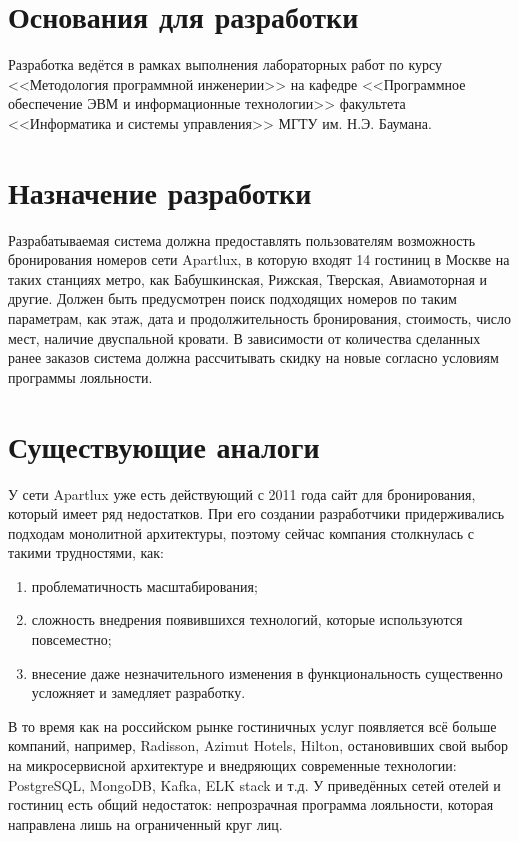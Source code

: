 \section*{Основания для разработки}
Разработка ведётся в рамках выполнения лабораторных работ по курсу <<Методология программной инженерии>> на кафедре <<Программное обеспечение ЭВМ и информационные технологии>> факультета <<Информатика и системы управления>> МГТУ им. Н.Э. Баумана.

\section*{Назначение разработки}
Разрабатываемая система должна предоставлять пользователям возможность бронирования номеров сети Apartlux, в которую входят 14 гостиниц в Москве на таких станциях метро, как Бабушкинская, Рижская, Тверская, Авиамоторная и другие. Должен быть предусмотрен поиск подходящих номеров по таким параметрам, как этаж, дата и продолжительность бронирования, стоимость, число мест, наличие двуспальной кровати. В зависимости от количества сделанных ранее заказов система должна рассчитывать скидку на новые согласно условиям программы лояльности.

\section*{Существующие аналоги}
У сети Apartlux уже есть действующий с 2011 года сайт для бронирования, который имеет ряд недостатков. При его создании разработчики придерживались подходам монолитной архитектуры, поэтому сейчас компания столкнулась с такими трудностями, как:
\begin{enumerate}
	\item проблематичность масштабирования;
	
	\item сложность внедрения появившихся технологий, которые используются повсеместно;
	
	\item внесение даже незначительного изменения в функциональность существенно усложняет и замедляет разработку.
\end{enumerate}

В то время как на российском рынке гостиничных услуг появляется всё больше компаний, например, Radisson, Azimut Hotels, Hilton, остановивших свой выбор на микросервисной архитектуре и внедряющих современные технологии: PostgreSQL, MongoDB, Kafka, ELK stack и т.д. У приведённых сетей отелей и гостиниц есть общий недостаток: непрозрачная программа лояльности, которая направлена лишь на ограниченный круг лиц.

